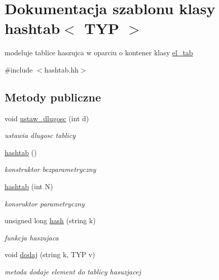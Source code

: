 \hypertarget{classhashtab}{\section{Dokumentacja szablonu klasy hashtab$<$ T\-Y\-P $>$}
\label{classhashtab}
}


modeluje tablice haszujca w oparciu o kontener klasy \hyperlink{classel__tab}{el\-\_\-tab}  




{\ttfamily \#include $<$hashtab.\-hh$>$}

\subsection*{Metody publiczne}
\begin{DoxyCompactItemize}
\item 
void \hyperlink{classhashtab_a94671e2fe307f5248c0b1b6855d4c3d4}{ustaw\-\_\-dlugosc} (int d)
\begin{DoxyCompactList}\small\item\em ustawia dlugosc tablicy \end{DoxyCompactList}\item 
\hyperlink{classhashtab_abcac01cb8d855d39b9d766a6f16856ee}{hashtab} ()
\begin{DoxyCompactList}\small\item\em konstruktor bezparametryczny \end{DoxyCompactList}\item 
\hyperlink{classhashtab_aa7315b45b8b2251113cc6d9c8d606bb8}{hashtab} (int N)
\begin{DoxyCompactList}\small\item\em konsruktor parametryczny \end{DoxyCompactList}\item 
unsigned long \hyperlink{classhashtab_ad52a5a127bcfe2b93bbec7fe702f10a6}{hash} (string k)
\begin{DoxyCompactList}\small\item\em funkcja haszujaca \end{DoxyCompactList}\item 
void \hyperlink{classhashtab_ad25515f0b7a631904c65b57f834c428f}{dodaj} (string k, T\-Y\-P v)
\begin{DoxyCompactList}\small\item\em metoda dodaje element do tablicy hasuzjacej \end{DoxyCompactList}\item 

\end{DoxyCompactItemize}
